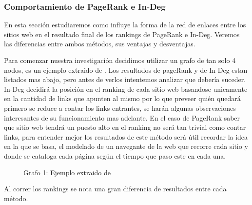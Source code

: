 
\subsubsection{Comportamiento de PageRank e In-Deg}

En esta sección estudiaremos como influye la forma de la red de enlaces entre los sitios web en el resultado final de los rankings de PageRank e In-Deg. Veremos las diferencias entre ambos métodos, sus ventajas y desventajas.

Para comenzar nuestra investigación decidimos utilizar un grafo de tan solo 4 nodos, es un ejemplo extraido de \cite{Bryan2006}. Los resultados de pageRank y de In-Deg estan listados mas abajo, pero antes de verlos intentemos analizar que debería suceder. In-Deg decidirá la posición en el ranking de cada sitio web basandose unicamente en la cantidad de links que apunten al mismo por lo que preveer quién quedará primero se reduce a contar los links entrantes, se harán algunas observaciones interesantes de su funcionamiento mas adelante. En el caso de PageRank saber que sitio web tendrá un puesto alto en el ranking no será tan trivial como contar links, para entender mejor los resultados de este método será útil recordar la idea en la que se basa, el modelado de un navegante de la web que recorre cada sitio y donde se cataloga cada página según el tiempo que paso este en cada una.

\begin{figure}[H]
\centering
{}
  \caption{\footnotesize{ Grafo 1: Ejemplo extraido de \cite{Bryan2006} }}
  \label{fig:Rankings}
\end{figure}

Al correr los rankings se nota una gran diferencia de resultados entre cada método.


